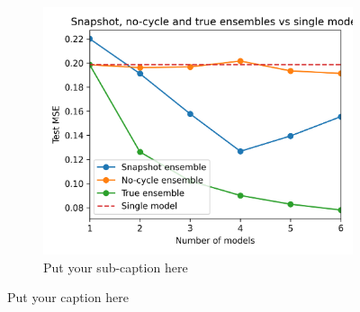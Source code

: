 \begin{figure}[ht]
	\begin{subfigure}{.5\textwidth}
		\centering
		\includegraphics[width=1\linewidth]{./figs/vary_snaps.png}  
		\caption{Put your sub-caption here}
		\label{fig:sub-second}
	\end{subfigure}
	\caption{Put your caption here}
	\label{fig:fig}
\end{figure}

\blindtext

